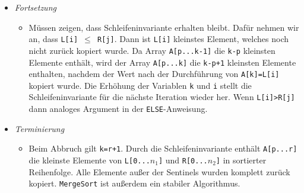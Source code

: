 \documentclass[
    ngerman,
    color=3b,
    load_common, %
    summary,
    boxarc,
]{tuda_summary}
\begin{document}
\begin{itemize}
\begin{itemize}
\begin{itemize}
                    \end{itemize}
                    \clearpage
              \item \textit{Fortsetzung}
                    \begin{itemize}
                        \item[]
                              Müssen zeigen, dass Schleifeninvariante erhalten bleibt. Dafür nehmen wir an, dass \texttt{L[i] $\leq$ R[j]}. Dann ist
                              \texttt{L[i]} kleinstes Element, welches noch nicht zurück kopiert wurde. Da Array \texttt{A[p...k-1]} die \texttt{k-p}
                              kleinsten Elemente enthält, wird der Array \texttt{A[p...k]} die \texttt{k-p+1} kleinsten Elemente enthalten, nachdem
                              der Wert nach der Durchführung von \texttt{A[k]=L[i]} kopiert wurde. Die Erhöhung der Variablen \texttt{k} und \texttt{i}
                              stellt die Schleifeninvariante für die nächste Iteration wieder her. Wenn \texttt{L[i]>R[j]} dann analoges Argument
                              in der \texttt{ELSE}-Anweisung.
                    \end{itemize}
              \item \textit{Terminierung}
                    \begin{itemize}
                        \item[]
                              Beim Abbruch gilt \texttt{k=r+1}. Durch die Schleifeninvariante enthält \texttt{A[p...r]} die kleinste Elemente von
                              \texttt{L[0...$n_1$]} und \texttt{R[0...$n_2$]} in sortierter Reihenfolge. Alle Elemente außer der Sentinels wurden
                              komplett zurück kopiert. \texttt{MergeSort} ist außerdem ein stabiler Algorithmus.
                    \end{itemize}
          \end{itemize}


\end{itemize}
\end{document}
